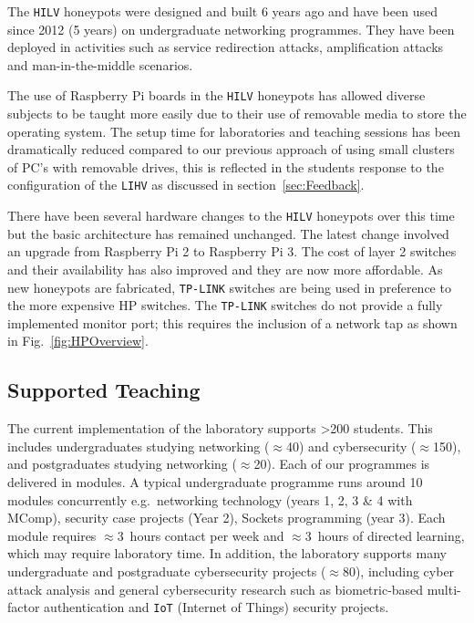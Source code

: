 \documentclass{ieeeaccess}
\begin{document}
The \texttt{HILV} honeypots were designed and built 6 years ago and have been
used since 2012 (5 years) on undergraduate networking programmes. They have been
deployed in activities such as service redirection attacks, amplification
attacks and man-in-the-middle scenarios.

The use of Raspberry Pi boards in the \texttt{HILV} honeypots has allowed
diverse subjects to be taught more easily due to their use of removable media
to store the operating system. The setup time for laboratories and teaching
sessions has been dramatically reduced compared to our previous approach of
using small clusters of PC's with removable drives, this is reflected in the
students response to the configuration of the \texttt{LIHV} as discussed in
section~\ref{sec:Feedback}.

There have been several hardware changes to the \texttt{HILV} honeypots over
this time but the basic architecture has remained unchanged. The latest change
involved an upgrade from Raspberry Pi 2 to Raspberry Pi 3. The cost of layer 2
switches and their availability has also improved and they are now more
affordable. As new honeypots are fabricated, \texttt{TP-LINK} switches are being used in
preference to the more expensive HP switches. The \texttt{TP-LINK} switches do not
provide a fully implemented monitor port; this requires the inclusion of a
network tap as shown in Fig.~\ref{fig:HPOverview}.

\subsection{Supported Teaching\label{ResourceSupport}}

The current implementation of the laboratory supports \textgreater200 students. This
includes undergraduates studying networking ($\approx$40) and cybersecurity
($\approx$150), and postgraduates studying networking ($\approx$20). Each of our
programmes is delivered in modules. A typical undergraduate programme runs
around 10 modules concurrently e.g.\ networking technology (years 1, 2, 3 \&
4 with MComp), security case projects (Year 2), Sockets programming (year 3).
Each module requires $\approx$3~hours contact per week and $\approx$3~hours of
directed learning, which may require laboratory time.  In addition, the
laboratory supports many undergraduate and postgraduate cybersecurity projects
($\approx$80), including cyber attack analysis and general cybersecurity research
such as biometric-based multi-factor authentication and \texttt{IoT} (Internet
of Things) security projects.
\end{document}
